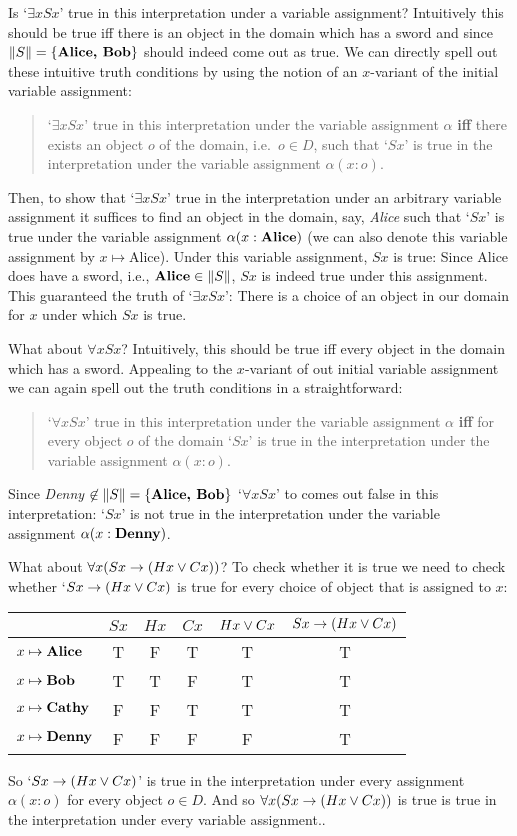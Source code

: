 \noindent Is `$\exists x Sx$' true in this interpretation under a variable assignment? Intuitively this should be true iff there is an object in the domain which has a sword and since $\|S\|=\{\text{\emph{Alice, Bob}}\}$ should indeed come out as true. We can directly spell out these intuitive truth conditions by using the notion of an  $x$-variant of the initial variable assignment:
\begin{quote}
`$\exists x Sx$' true in this interpretation under the variable assignment $\alpha$ \textbf{iff} there exists an object $o$ of the domain, i.e.~$o\in D$, such that `$Sx$' is true in the interpretation under the variable assignment $\alpha(x:o)$.
\end{quote}
Then, to show that `$\exists x Sx$' true in the interpretation under an arbitrary variable assignment it suffices to find an object in the domain, say, \emph{Alice} such that `$Sx$' is true under the variable assignment $\alpha(x:\text{\emph{Alice}})$  (we can also denote this variable assignment by $x\mapsto \text{Alice}$). Under this variable assignment, $Sx$ is true: Since Alice does have a sword, i.e., $\text{\emph{Alice}}\in\|S\|$, $Sx$ is indeed true under this assignment. This guaranteed the truth of `$\exists x Sx$': There is a choice of an object in our domain for $x$ under which $Sx$ is true.

What about $\forall x Sx$? Intuitively, this should be true iff every object in the domain which has a sword. Appealing to the $x$-variant of out initial variable assignment we can again spell out the truth conditions in a straightforward:
\begin{quote}
`$\forall x Sx$' true in this interpretation under the variable assignment $\alpha$ \textbf{iff} for every object $o$ of the domain `$Sx$' is true in the interpretation under the variable assignment $\alpha(x:o)$.
\end{quote}
 Since \emph{Denny} $\not\in\|S\|=\{\text{\emph{Alice, Bob}}\}$ `$\forall x Sx$' to comes out false in this interpretation: `$Sx$' is not true in the interpretation under the variable assignment $\alpha(x:\emph{Denny})$. 

What about $\forall x(Sx\eif (Hx\eor Cx))$? To check whether it is true we need to check whether `$Sx\eif(Hx\eor Cx)$ is true for every choice of object that is assigned to $x$:
\begin{center}
\begin{tabular}{l|ccccc}
&$Sx$&$Hx$&$Cx$&$Hx\eor Cx$&$Sx\eif (Hx\eor Cx)$\Bstrut\\\hline\Tstrut
$x\mapsto\text{\emph{Alice}}$&T&F&T&T&T\\
$x\mapsto \text{\emph{Bob}}$&T&T&F&T&T\\
$x\mapsto \text{\emph{Cathy}}$&F&F&T&T&T\\
$x\mapsto \text{\emph{Denny}}$&F&F&F&F&T
\end{tabular}
\end{center}
So `$Sx\eif (Hx\eor Cx)$'  is true in the interpretation under every assignment $\alpha(x:o)$ for every object $o\in D$. And so $\forall x(Sx\eif (Hx\eor Cx))$ is true is true in the interpretation under every variable assignment..



